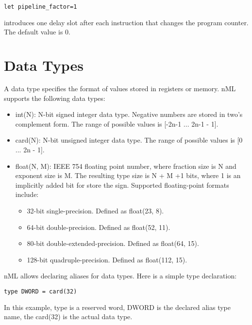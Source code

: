 \documentclass[oneside,final,14pt]{extreport}
\begin{document}
\begin{lstlisting}
let pipeline_factor=1
\end{lstlisting}

introduces one delay slot after each instruction that changes the program counter. The default
value is 0.

\section{Data Types}

A data type specifies the format of values stored in registers or memory. nML supports
the following data types: 

\begin{itemize}

\item int(N): N-bit signed integer data type. Negative numbers are stored in two's 
complement form. The range of possible values is [-2n-1 ... 2n-1 - 1].

\item card(N): N-bit unsigned integer data type. The range of possible values is [0 ... 2n - 1].

\item float(N, M): IEEE 754 floating point number, where fraction size is N and exponent size is M.
The resulting type size is N + M +1 bits, where 1 is an implicitly added bit for store the sign.
Supported floating-point formats include:

\begin{itemize}
\item 32-bit single-precision. Defined as float(23, 8).
\item 64-bit double-precision. Defined as float(52, 11).
\item 80-bit double-extended-precision. Defined as float(64, 15).
\item 128-bit quadruple-precision. Defined as float(112, 15).
\end{itemize}

\end{itemize}

nML allows declaring aliases for data types. Here is a simple type declaration:

\begin{lstlisting}
type DWORD = card(32)
\end{lstlisting}

In this example, type is a reserved word, DWORD is the declared alias type name, the card(32) is
the actual data type.
\end{document}
